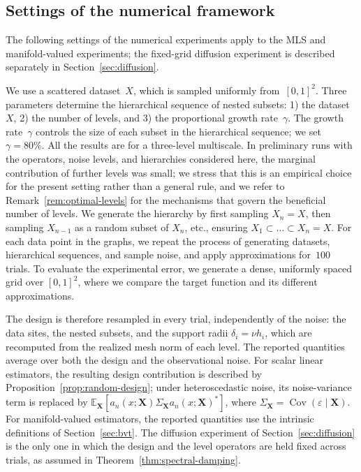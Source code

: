 \documentclass[12pt]{article}
\begin{document}
\subsection{Settings of the numerical framework}\label{sec:num-settings}

The following settings of the numerical experiments apply to the MLS and manifold-valued experiments; the fixed-grid diffusion experiment is described separately in Section~\ref{sec:diffusion}.

We use a scattered dataset~$X$, which is sampled uniformly from~$[0,1]^2$. Three parameters determine the hierarchical sequence of nested subsets: 1) the dataset~$X$, 2) the number of levels, and 3) the proportional growth rate~$\gamma$. The growth rate~$\gamma$ controls the size of each subset in the hierarchical sequence; we set~$\gamma=80\%$. All the results are for a three-level multiscale. In preliminary runs with the operators, noise levels, and hierarchies considered here, the marginal contribution of further levels was small; we stress that this is an empirical choice for the present setting rather than a general rule, and we refer to Remark~\ref{rem:optimal-levels} for the mechanisms that govern the beneficial number of levels. We generate the hierarchy by first sampling $X_n=X$, then sampling $X_{n-1}$ as a random subset of $X_n$, etc., ensuring $ X_1 \subset \ldots \subset X_n = X$. For each data point in the graphs, we repeat the process of generating datasets, hierarchical sequences, and sample noise, and apply approximations for~$100$ trials. To evaluate the experimental error, we generate a dense, uniformly spaced grid over $[0,1]^2$, where we compare the target function and its different approximations.

The design is therefore resampled in every trial, independently of the noise: the data sites, the nested subsets, and the support radii $\delta_i=\nu h_i$, which are recomputed from the realized mesh norm of each level. The reported quantities average over both the design and the
observational noise. For scalar linear estimators, the resulting
design contribution is described by
Proposition~\ref{prop:random-design}; under heteroscedastic noise,
its noise-variance term is replaced by
$\mathbb E_{\mathbf X}
[a_n(x;\mathbf X)\Sigma_{\mathbf X}a_n(x;\mathbf X)^*]$,
where $\Sigma_{\mathbf X}
=\operatorname{Cov}(\varepsilon\mid\mathbf X)$.
For manifold-valued estimators, the reported quantities use
the intrinsic definitions of Section~\ref{sec:bvt}. The diffusion experiment of Section~\ref{sec:diffusion} is the only one in which the design and the level operators are held fixed across trials, as assumed in Theorem~\ref{thm:spectral-damping}.
\end{document}
